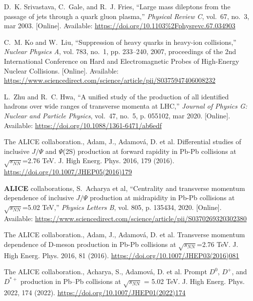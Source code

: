 \documentclass[twocolumn,aps,superscriptaddress,nofootinbib,floatfix]{revtex4}
\begin{document}
\begin{thebibliography}{99}

D.~K. Srivastava, C.~Gale, and R.~J. Fries, ``Large mass dileptons from the
passage of jets through a quark gluon plasma,'' \emph{Physical Review C},
vol.~67, no.~3, mar 2003. [Online]. Available:
\url{https://doi.org/10.1103%2Fphysrevc.67.034903}

C.~M. Ko and W.~Liu, ``Suppression of heavy quarks in heavy-ion collisions,''
\emph{Nuclear Physics A}, vol. 783, no.~1, pp. 233--240, 2007, proceedings of
the 2nd International Conference on Hard and Electromagnetic Probes of
High-Energy Nuclear Collisions. [Online]. Available:
\url{https://www.sciencedirect.com/science/article/pii/S0375947406008232}

L.~Zhu and R.~C. Hwa, ``A unified study of the production of all identified
hadrons over wide ranges of transverse momenta at {LHC},'' \emph{Journal of
	Physics G: Nuclear and Particle Physics}, vol.~47, no.~5, p. 055102, mar
2020. [Online]. Available: \url{https://doi.org/10.1088/1361-6471/ab6edf}

The ALICE collaboration., Adam, J., Adamová, D. et al. Differential studies of inclusive $J/\Psi$ and $\Psi$(2S) production at forward rapidity in Pb-Pb collisions at $\sqrt{ s_{NN} }$=2.76 TeV. J. High Energ. Phys. 2016, 179 (2016). 
\url{https://doi.org/10.1007/JHEP05(2016)179}

\textbf{ALICE} collaborations, S.~Acharya et al, ``Centrality and transverse
momentum dependence of inclusive $J/\Psi$ production at midrapidity in Pb-Pb
collisions at $\sqrt{s_{NN}}$=5.02 TeV,'' \emph{Physics Letters B}, vol. 805, p. 135434,
2020. [Online]. Available:
\url{https://www.sciencedirect.com/science/article/pii/S0370269320302380}

The ALICE collaboration., Adam, J., Adamová, D. et al. Transverse momentum dependence of D-meson production in Pb-Pb collisions at $\sqrt{s_{NN}}$=2.76 TeV. J. High Energ. Phys. 2016, 81 (2016). \url{https://doi.org/10.1007/JHEP03(2016)081}

The ALICE collaboration., Acharya, S., Adamová, D. et al. Prompt $D^0$, $D^+$, and $D^{*+}$ production in Pb–Pb collisions at $\sqrt{s_{NN}}$ = 5.02 TeV. J. High Energ. Phys. 2022, 174 (2022). \url{https://doi.org/10.1007/JHEP01(2022)174}


\end{thebibliography}
\end{document}
